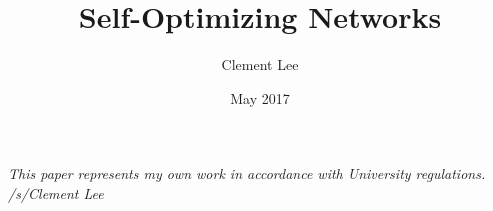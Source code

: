\documentclass[12pt]{report}
\title{Self-Optimizing Networks}
\author{Clement Lee}
\date{May 2017}
\begin{document}
%

\tableofcontents

% 















\nocite{*}



\vfill
\begin{center}
\emph{This paper represents my own work in accordance with University regulations.\\
/s/Clement Lee}
\end{center}
\end{document}
